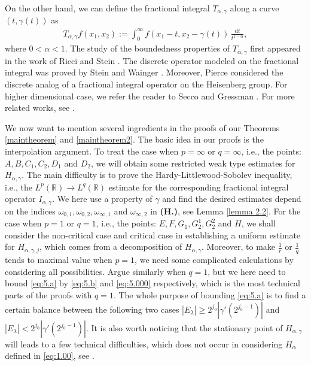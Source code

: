 \documentclass[11pt, twoside, leqno]{article}
\theoremstyle{definition}
\numberwithin{equation}{section}
\begin{document}
On the other hand, we can define the fractional integral $ T_{\alpha,\gamma}$ along a curve $(t,\gamma(t))$ as
\begin{align*}
 T_{\alpha,\gamma}f(x_1,x_2):=\int_{0}^{\infty}f(x_1-t,x_2-\gamma(t))\,\frac{\textrm{d}t}{t^{1-\alpha}},
 \end{align*}
where $0<\alpha<1$. The study of the boundedness properties of $T_{\alpha,\gamma}$ first appeared in the work of Ricci and Stein \cite{RStein}. The discrete operator modeled on the fractional integral was proved by Stein and Wainger \cite{SteW00}. Moreover, Pierce \cite{Pierce} considered the discrete analog of a fractional integral operator on the Heisenberg group. For higher dimensional case, we refer the reader to Secco \cite{Secco} and Gressman \cite{Gressman}. For more related works, see \cite{Grafa93,SeWain}.

We now want to mention several ingredients in the proofs of our Theorems \ref{maintheorem} and \ref{maintheorem2}. The basic idea in our proofs is the interpolation argument. To treat the case when $p=\infty$ or $q=\infty$, i.e., the points: $A, B, C_1, C_2, D_1$ and $D_2$, we will obtain some restricted weak type estimates for $H_{\alpha,\gamma}$. The main difficulty is to prove the Hardy-Littlewood-Sobolev inequality, i.e., the $L^p(\mathbb{R})\rightarrow L^q(\mathbb{R})$ estimate for the corresponding fractional integral operator $I_{\alpha,\gamma}$. We here use a property of $\gamma$ and find the desired estimates depend on the indices $\omega_{0,1}, \omega_{0,2}, \omega_{\infty,1}$ and $\omega_{\infty,2}$ in \textbf{(H.)}, see Lemma \ref{lemma 2.2}. For the case when $p=1$ or $q=1$, i.e., the points: $E, F, G_1, G_2^1, G_2^2$ and $H$, we shall consider the non-critical case and critical case in establishing a uniform estimate for $H_{\alpha,\gamma,j}$, which comes from a decomposition of $H_{\alpha,\gamma}$. Moreover, to make $\frac{1}{r}$ or $\frac{1}{q}$ tends to maximal value when $p=1$, we need some complicated calculations by considering all possibilities. Argue similarly when $q=1$, but we here need to bound \eqref{eq:5.a} by \eqref{eq:5.b} and \eqref{eq:5.000} respectively, which is the most technical parts of the proofs with $q=1$. The whole purpose of bounding \eqref{eq:5.a} is to find a certain balance between the following two cases $|E_\lambda|\geq2^{j_0}|\gamma'(2^{j_{0}-1})|$ and $|E_\lambda|<2^{j_0}|\gamma'(2^{j_{0}-1})|$. It is also worth noticing that the stationary point of $H_{\alpha,\gamma}$ will leads to a few technical difficulties, which does not occur in considering $H_{\alpha}$ defined in \eqref{eq:1.00}, see \cite{KStein,Grafk,Graf92}.
\end{document}
